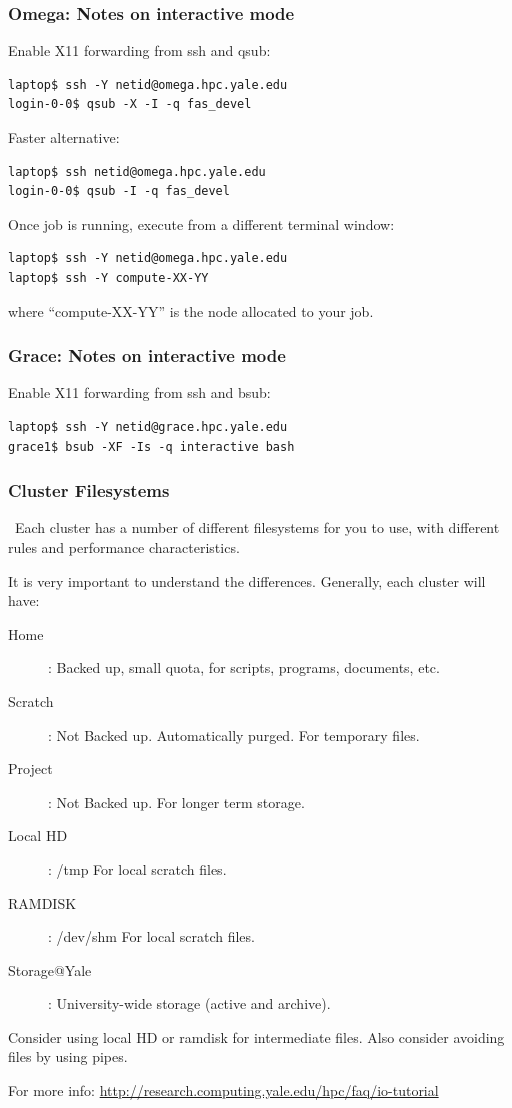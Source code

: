 \documentclass[10pt]{beamer}
\begin{document}
\begin{frame}[fragile]
\frametitle{Omega: Notes on interactive mode}
Enable X11 forwarding from ssh and qsub:
\begin{verbatim}
laptop$ ssh -Y netid@omega.hpc.yale.edu
login-0-0$ qsub -X -I -q fas_devel
\end{verbatim}

Faster alternative:
\begin{verbatim}
laptop$ ssh netid@omega.hpc.yale.edu
login-0-0$ qsub -I -q fas_devel
\end{verbatim}

Once job is running, execute from a different terminal window:
\begin{verbatim}
laptop$ ssh -Y netid@omega.hpc.yale.edu
laptop$ ssh -Y compute-XX-YY
\end{verbatim}

where ``compute-XX-YY'' is the node allocated to your job.
\end{frame}

\begin{frame}[fragile]
\frametitle{Grace: Notes on interactive mode}
Enable X11 forwarding from ssh and bsub:
\begin{verbatim}
laptop$ ssh -Y netid@grace.hpc.yale.edu
grace1$ bsub -XF -Is -q interactive bash
\end{verbatim}
\end{frame}

\begin{frame}[fragile]
\frametitle{Cluster Filesystems}\
Each cluster has a number of different filesystems for you to use, with different
rules and performance characteristics.  

\vskip10pt

It is very important to understand the differences.  Generally, each cluster will have:

\begin{description}
\item[Home]: Backed up, small quota, for scripts, programs, documents, etc.
\item[Scratch]: Not Backed up.  Automatically purged.  For temporary files.
\item[Project]: Not Backed up.  For longer term storage.
\item[Local HD]: /tmp  For local scratch files.
\item[RAMDISK]: /dev/shm For local scratch files.
\item[Storage@Yale]: University-wide storage (active and archive).
\end{description}

Consider using local HD or ramdisk for intermediate files.  Also consider avoiding files by using pipes.

For more info: \url{http://research.computing.yale.edu/hpc/faq/io-tutorial}

\end{frame}
\end{document}
